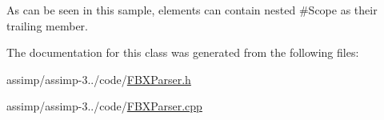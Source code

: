 As can be seen in this sample, elements can contain nested \#\+Scope as their trailing member. 

The documentation for this class was generated from the following files\+:\begin{DoxyCompactItemize}
\item 
assimp/assimp-\/3../code/\hyperlink{_f_b_x_parser_8h}{F\+B\+X\+Parser.\+h}\item 
assimp/assimp-\/3../code/\hyperlink{_f_b_x_parser_8cpp}{F\+B\+X\+Parser.\+cpp}\end{DoxyCompactItemize}
